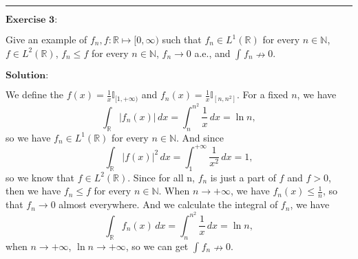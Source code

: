 \documentclass[12pt,a4paper]{ctexart}
\begin{document}
\noindent\rule[0.25\baselineskip]{\textwidth}{0.5pt}

\vspace{8pt}

$\textbf{Exercise 3:}$

Give an example of $f_n, f : \mathbb{R} \mapsto [0, \infty)$ such that $f_{n} \in L^{1}(\mathbb{R})$ for every $n \in \mathbb{N}$, $f \in L^{2}(\mathbb{R})$, $f_{n} \leq f$ for every $n \in \mathbb{N}$, $f_{n} \to 0$ a.e., and $\int_{}^{} f_{n} \nrightarrow 0$.

\vspace{8pt}
$\textbf{Solution:}$

We define the $f(x) = \frac{1}{x} \mathbb{I}_{[1, +\infty)}$ and $f_{n}(x) = \frac{1}{x} \mathbb{I}_{[n, n^{2}]}$. For a fixed $n$, we have
\begin{equation*}
\int_{\mathbb{R}}^{} |f_{n}(x)| \, d x = \int_{n}^{n^{2}} \frac{1}{x} \, d x = \ln{n},
\end{equation*}
so we have $f_{n} \in L^{1}(\mathbb{R})$ for every $n \in \mathbb{N}$. And since
\begin{equation*}
\int_{\mathbb{R}}^{} |f(x)|^{2} \, d x = \int_{1}^{+ \infty} \frac{1}{x^{2}} \, d x = 1,
\end{equation*}
so we know that $f \in L^{2}(\mathbb{R})$. Since for all n, $f_{n}$ is just a part of $f$ and $f > 0$, then we have $f_{n} \leq f$ for every $n \in \mathbb{N}$. When $n \to +\infty$, we have $f_{n}(x) \leq \frac{1}{n}$, so that $f_{n} \to 0$ almost everywhere. And we calculate the integral of $f_{n}$, we have
\begin{equation*}
\int_{\mathbb{R}}^{} f_{n}(x) \, d x = \int_{n}^{n^{2}} \frac{1}{x} \, d x = \ln{n},
\end{equation*}
when $n \to + \infty$, $\ln{n} \to + \infty$, so we can get $\int_{}^{} f_{n} \nrightarrow 0$.
\end{document}
